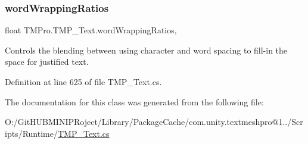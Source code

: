 \subsubsection{\texorpdfstring{wordWrappingRatios}{wordWrappingRatios}}
{\footnotesize\ttfamily float T\+M\+Pro.\+T\+M\+P\+\_\+\+Text.\+word\+Wrapping\+Ratios\hspace{0.3cm}{\ttfamily [get]}, {\ttfamily [set]}}



Controls the blending between using character and word spacing to fill-\/in the space for justified text. 



Definition at line 625 of file T\+M\+P\+\_\+\+Text.\+cs.



The documentation for this class was generated from the following file\+:\begin{DoxyCompactItemize}
\item 
O\+:/\+Git\+H\+U\+B\+M\+I\+N\+I\+P\+Roject/\+Library/\+Package\+Cache/com.\+unity.\+textmeshpro@1../\+Scripts/\+Runtime/\mbox{\hyperlink{_t_m_p___text_8cs}{T\+M\+P\+\_\+\+Text.\+cs}}\end{DoxyCompactItemize}
